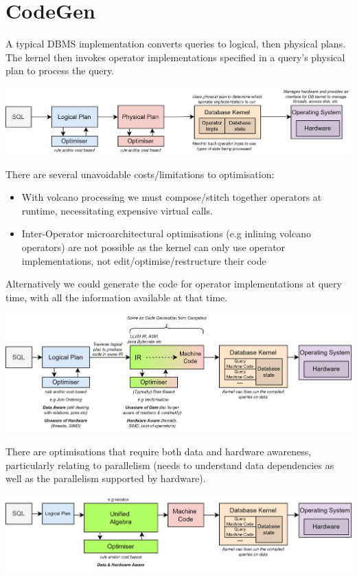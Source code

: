\section{CodeGen}
A typical DBMS implementation converts queries to logical, then physical plans. The kernel then invokes operator implementations specified in a query's physical plan to process the query.
\begin{center}
    \includegraphics[width=\textwidth]{advanced_topics/images/naive_query_path.drawio.png}
\end{center}
There are several unavoidable costs/limitations to optimisation:
\begin{itemize}
    \item With volcano processing we must compose/stitch together operators at runtime, necessitating expensive virtual calls.
    \item Inter-Operator microarchitectural optimisations (e.g inlining volcano operators) are not possible as the kernel can only use operator implementations, not edit/optimise/restructure their code
\end{itemize}
Alternatively we could generate the code for operator implementations at query time, with all the information available at that time.
\begin{center}
    \includegraphics[width=\textwidth]{advanced_topics/images/query_compilation_path.drawio.png}
\end{center}
There are optimisations that require both data and hardware awareness, particularly relating to parallelism (needs to understand data dependencies as well as the parallelism supported by hardware).
\begin{center}
    \includegraphics[width=\textwidth]{advanced_topics/images/unified_algebra_path.drawio.png}
\end{center}

